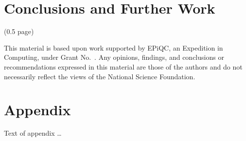 \documentclass[acmsmall,review]{acmart}\settopmatter{printfolios=true,printccs=false,printacmref=false}
\begin{document}
\section{Conclusions and Further Work}

(0.5 page)

\begin{acks}                            %
  This material is based upon work supported by
  EPiQC, an 
  Expedition in Computing, under Grant
  No.~.  Any opinions, findings, and
  conclusions or recommendations expressed in this material are those
  of the authors and do not necessarily reflect the views of the
  National Science Foundation.
\end{acks}





\appendix
\section{Appendix}

Text of appendix \ldots
\end{document}
